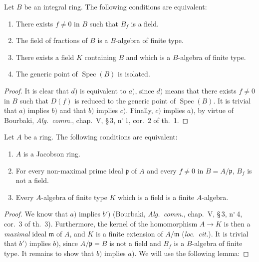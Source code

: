 \begin{proposition}[10.4.4]
\label{IV.10.4.4}
Let $B$ be an integral ring.
The following conditions are equivalent:
\begin{enumerate}[label=\emph{\alph*)}]
  \item There exists $f\neq 0$ in $B$ such that $B_f$ is a field.
  \item The field of fractions of $B$ is a $B$-algebra of finite type.
  \item There exists a field $K$ containing $B$ and which is a $B$-algebra of finite type.
  \item The generic point of $\operatorname{Spec}(B)$ is isolated.
\end{enumerate}
\end{proposition}

\begin{proof}
It is clear that $d)$ is equivalent to $a)$, since $d)$ means that there exists $f\neq 0$ in $B$ such that $D(f)$ is reduced to the generic point of $\operatorname{Spec}(B)$.
It is trivial that $a)$ implies $b)$ and that $b)$ implies $c)$.
Finally, $c)$ implies $a)$, by virtue of Bourbaki, \emph{Alg.\ comm.}, chap.~V, \S\,3, n$^\circ$\,1, cor.~2 of th.~1.
\end{proof}

\begin{proposition}[10.4.5]
\label{IV.10.4.5}
Let $A$ be a ring.
The following conditions are equivalent:
\begin{enumerate}[label=\emph{\alph*)}]
  \item $A$ is a Jacobson ring.
  \item For every non-maximal prime ideal $\mathfrak{p}$ of $A$ and every $f\neq 0$ in $B=A/\mathfrak{p}$, $B_f$ is not a field.
  \item[\rm b$'$)] Every $A$-algebra of finite type $K$ which is a field is a finite $A$-algebra.
\end{enumerate}
\end{proposition}

\begin{proof}
We know that $a)$ implies $b')$ (Bourbaki, \emph{Alg.\ comm.}, chap.~V, \S\,3, n$^\circ$\,4, cor.~3 of th.~3).
Furthermore, the kernel of the homomorphism $A\to K$ is then a \emph{maximal} ideal $\mathfrak{m}$ of $A$, and $K$ is a finite extension of $A/\mathfrak{m}$ (\emph{loc.\ cit.}).
It is trivial that $b')$ implies $b)$, since $A/\mathfrak{p}=B$ is not a field and $B_f$ is a $B$-algebra of finite type.
It remains to show that $b)$ implies $a)$.
We will use the following lemma:
\end{proof}

